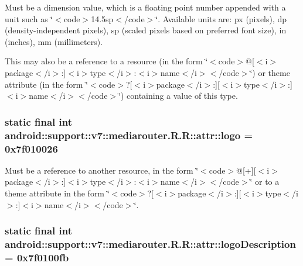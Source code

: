 Must be a dimension value, which is a floating point number appended with a unit such as \char`\"{}$<$code$>$14.5sp$<$/code$>$\char`\"{}. Available units are: px (pixels), dp (density-independent pixels), sp (scaled pixels based on preferred font size), in (inches), mm (millimeters). 

This may also be a reference to a resource (in the form \char`\"{}$<$code$>$@\mbox{[}$<$i$>$package$<$/i$>$:\mbox{]}$<$i$>$type$<$/i$>$:$<$i$>$name$<$/i$>$$<$/code$>$\char`\"{}) or theme attribute (in the form \char`\"{}$<$code$>$?\mbox{[}$<$i$>$package$<$/i$>$:\mbox{]}\mbox{[}$<$i$>$type$<$/i$>$:\mbox{]}$<$i$>$name$<$/i$>$$<$/code$>$\char`\"{}) containing a value of this type. \hypertarget{classandroid_1_1support_1_1v7_1_1mediarouter_1_1_r_1_1attr_fafc68ea72e118080a57bcb2e2e65e45}{
\subsubsection[{logo}]{\setlength{\rightskip}{0pt plus 5cm}static final int android::support::v7::mediarouter.R.R::attr::logo = 0x7f010026}}
\label{classandroid_1_1support_1_1v7_1_1mediarouter_1_1_r_1_1attr_fafc68ea72e118080a57bcb2e2e65e45}


Must be a reference to another resource, in the form \char`\"{}$<$code$>$@\mbox{[}+\mbox{]}\mbox{[}$<$i$>$package$<$/i$>$:\mbox{]}$<$i$>$type$<$/i$>$:$<$i$>$name$<$/i$>$$<$/code$>$\char`\"{} or to a theme attribute in the form \char`\"{}$<$code$>$?\mbox{[}$<$i$>$package$<$/i$>$:\mbox{]}\mbox{[}$<$i$>$type$<$/i$>$:\mbox{]}$<$i$>$name$<$/i$>$$<$/code$>$\char`\"{}. \hypertarget{classandroid_1_1support_1_1v7_1_1mediarouter_1_1_r_1_1attr_d76b3e9e07abbe2a0948f7737fa475d5}{
\subsubsection[{logoDescription}]{\setlength{\rightskip}{0pt plus 5cm}static final int android::support::v7::mediarouter.R.R::attr::logoDescription = 0x7f0100fb}}
\label{classandroid_1_1support_1_1v7_1_1mediarouter_1_1_r_1_1attr_d76b3e9e07abbe2a0948f7737fa475d5}


